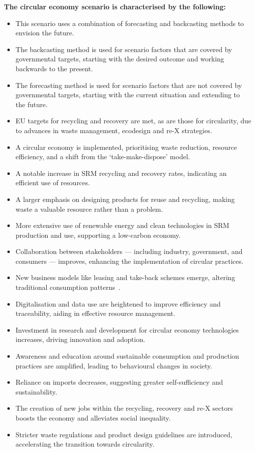 \textbf{The circular economy scenario is characterised by the following:}
\begin{itemize}
\item This scenario uses a combination of forecasting and backcasting methods to envision the future.
\item The backcasting method is used for scenario factors that are covered by governmental targets, starting with the desired outcome and working backwards to the present.
\item The forecasting method is used for scenario factors that are not covered by governmental targets, starting with the current situation and extending to the future.
\item EU targets for recycling and recovery are met, as are those for circularity, due to advances in waste management, ecodesign and re-X strategies.
\item A circular economy is implemented, prioritising waste reduction, resource efficiency, and a shift from the `take-make-dispose' model.
\item A notable increase in SRM recycling and recovery rates, indicating an efficient use of resources.
\item A larger emphasis on designing products for reuse and recycling, making waste a valuable resource rather than a problem.
\item More extensive use of renewable energy and clean technologies in SRM production and use, supporting a low-carbon economy.
\item Collaboration between stakeholders --- including industry, government, and consumers --- improves, enhancing the implementation of circular practices.
\item New business models like leasing and take-back schemes emerge, altering traditional consumption patterns~\cite{geissdorfer2020circbusinessmodels}.
\item Digitalisation and data use are heightened to improve efficiency and traceability, aiding in effective resource management.
\item Investment in research and development for circular economy technologies increases, driving innovation and adoption.
\item Awareness and education around sustainable consumption and production practices are amplified, leading to behavioural changes in society.
\item Reliance on imports decreases, suggesting greater self-sufficiency and sustainability.
\item The creation of new jobs within the recycling, recovery and re-X sectors boosts the economy and alleviates social inequality.
\item Stricter waste regulations and product design guidelines are introduced, accelerating the transition towards circularity.
\end{itemize}

\sectionEndlines
\clearpage